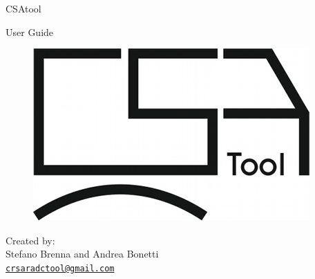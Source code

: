 \label{cover}

\begin{center}

{ \Huge
CSAtool
}

\vspace{5 mm}

{ \Large
User Guide
}

\vspace{10 mm}

\begin{figure}[h!]
	\centering
	\includegraphics[scale=1.0]{pics/logo.png}
	\label{fig:logo}
\end{figure}

\vspace{20 mm}

{ \large
Created by:
\\ Stefano Brenna and Andrea Bonetti
\\ 
\href{mailto:crsaradctool@gmail.com}{\nolinkurl{crsaradctool@gmail.com}}

}



\end{center}
